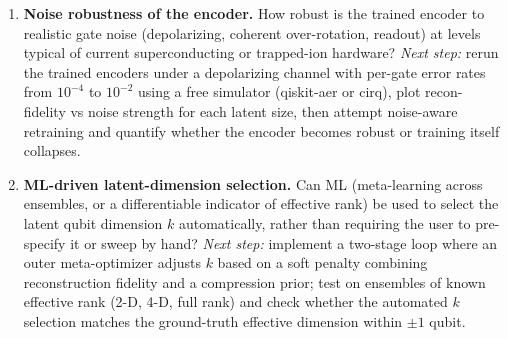 \begin{enumerate}
\item \textbf{Noise robustness of the encoder.}
How robust is the trained encoder to realistic gate noise (depolarizing,
coherent over-rotation, readout) at levels typical of current superconducting
or trapped-ion hardware?
\emph{Next step:} rerun the trained encoders under a depolarizing channel with
per-gate error rates from $10^{-4}$ to $10^{-2}$ using a free simulator
(qiskit-aer or cirq), plot recon-fidelity vs noise strength for each latent
size, then attempt noise-aware retraining and quantify whether the encoder
becomes robust or training itself collapses.

\item \textbf{ML-driven latent-dimension selection.}
Can ML (meta-learning across ensembles, or a differentiable indicator of
effective rank) be used to select the latent qubit dimension $k$ automatically,
rather than requiring the user to pre-specify it or sweep by hand?
\emph{Next step:} implement a two-stage loop where an outer meta-optimizer
adjusts $k$ based on a soft penalty combining reconstruction fidelity and a
compression prior; test on ensembles of known effective rank (2-D, 4-D, full
rank) and check whether the automated $k$ selection matches the ground-truth
effective dimension within $\pm 1$ qubit.

\end{enumerate}
